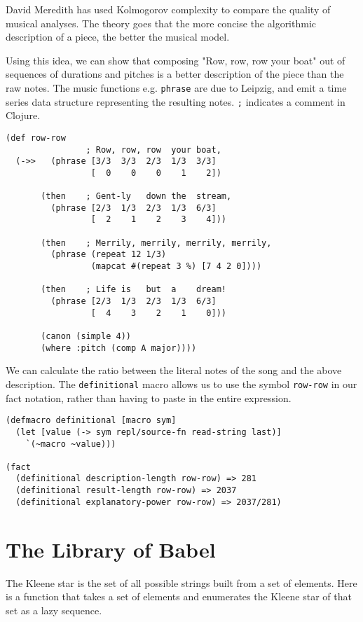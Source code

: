 \documentclass[numbers, preprint]{sigplanconf}
\begin{document}
David Meredith has used Kolmogorov complexity to compare the quality of musical analyses\cite{Analysis by Compression}.
The theory goes that the
more concise the algorithmic description of a piece, the better the musical model.

Using this idea, we can show that composing "Row, row, row your boat" out of sequences of durations and pitches
is a better description of the piece than the raw notes. The music functions e.g. \verb|phrase| are due to Leipzig,
and emit a time series data structure representing the resulting notes. \verb|;| indicates a comment in Clojure.

\begin{verbatim}
(def row-row
                ; Row, row, row  your boat,
  (->>   (phrase [3/3  3/3  2/3  1/3  3/3]
                 [  0    0    0    1    2])

       (then    ; Gent-ly   down the  stream,
         (phrase [2/3  1/3  2/3  1/3  6/3]
                 [  2    1    2    3    4]))

       (then    ; Merrily, merrily, merrily, merrily,
         (phrase (repeat 12 1/3)
                 (mapcat #(repeat 3 %) [7 4 2 0])))

       (then    ; Life is   but  a    dream!
         (phrase [2/3  1/3  2/3  1/3  6/3]
                 [  4    3    2    1    0]))

       (canon (simple 4))
       (where :pitch (comp A major))))
\end{verbatim}

We can calculate the ratio between the literal notes of the song and the above description.
The \verb|definitional| macro allows us to use the symbol \verb|row-row| in our fact notation, rather than
having to paste in the entire expression.

\begin{verbatim}
(defmacro definitional [macro sym]
  (let [value (-> sym repl/source-fn read-string last)]
    `(~macro ~value)))

(fact
  (definitional description-length row-row) => 281
  (definitional result-length row-row) => 2037
  (definitional explanatory-power row-row) => 2037/281)
\end{verbatim}

\section{The Library of Babel}

The Kleene star is the set of all possible strings built from a set of elements. Here is a function that takes a set of
elements and enumerates the Kleene star of that set as a lazy sequence.
\end{document}
